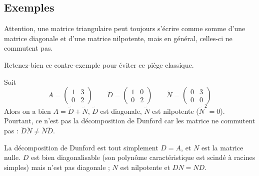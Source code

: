 \documentclass[12pt, class=report,crop=false]{standalone}
\begin{document}
\subsection{Exemples}



Attention, une matrice triangulaire peut toujours s'écrire 
comme somme d'une matrice diagonale et d'une matrice nilpotente, 
mais en général, celles-ci ne commutent pas. 

Retenez-bien ce contre-exemple pour éviter ce piège classique.
\begin{exemple}
Soit 
$$A = \begin{pmatrix}
1 & 3\\
0 & 2
\end{pmatrix}
\qquad \tilde D =  \begin{pmatrix}
1 & 0\\
0 & 2
\end{pmatrix}
\qquad \tilde N =  \begin{pmatrix}
0 & 3\\
0 & 0
\end{pmatrix}$$
Alors on a bien $A = \tilde D + \tilde N$, $\tilde D$ est diagonale,
$\tilde N$ est nilpotente ($\tilde N^2 = 0$). Pourtant, ce n'est pas la décomposition de Dunford car les matrice ne commutent pas : $\tilde D \tilde N \neq \tilde N \tilde D$.
 
La décomposition de Dunford est tout simplement $D = A$, et $N$ est la matrice nulle.
$D$ est bien diagonalisable (son polynôme caractéristique est scindé à racines simples)
mais n'est pas diagonale ; $N$ est nilpotente et $DN=ND$. 
\end{exemple}

\bigskip
\end{document}
